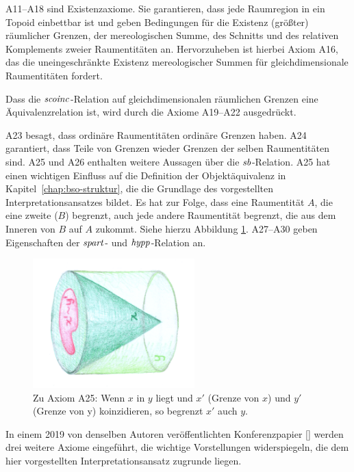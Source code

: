 A11--A18
sind Existenzaxiome. 
Sie garantieren, dass jede Raumregion in ein Topoid einbettbar ist und geben Bedingungen für die Existenz (größter) räumlicher Grenzen, der mereologischen Summe, des Schnitts und des relativen Komplements zweier Raumentitäten an.
Hervorzuheben ist hierbei Axiom A16, das die uneingeschränkte Existenz mereologischer Summen für gleichdimensionale Raumentitäten fordert.

Dass
die $\mathit{scoinc}$-Relation auf gleichdimensionalen räumlichen Grenzen eine Äquivalenzrelation ist, wird durch die Axiome A19--A22 ausgedrückt.

A23
besagt, dass ordinäre Raumentitäten ordinäre Grenzen haben.
A24 garantiert, dass Teile von Grenzen wieder Grenzen der selben Raumentitäten sind.
A25 und A26 enthalten weitere Aussagen über die $\mathit{sb}$-Relation.
A25 hat einen wichtigen Einfluss auf die Definition der Objektäquivalenz in Kapitel~\ref{chap:bso-struktur}, die die Grundlage des vorgestellten Interpretationsansatzes bildet.
Es hat zur Folge, dass eine Raumentität $A$, die eine zweite ($B$) begrenzt, auch jede andere Raumentität begrenzt, die \glqq aus dem Inneren von $B$ auf $A$ zukommt\grqq .
Siehe hierzu Abbildung \ref{fig:A25}.
A27--A30
geben Eigenschaften der $\mathit{spart}$- und $\mathit{hypp}$-Relation an.


    \begin{figure}[ht]
        \centering
        \includegraphics[height=5cm]{abb/a25.png}
        \caption[Zu Axiom 25]{Zu Axiom A25: Wenn $x$ in $y$ liegt und $x'$ (Grenze von $x$) und $y'$ (Grenze von y) koinzidieren, so begrenzt $x'$ auch $y$.}
        \label{fig:A25}
    \end{figure}
    
    In
    einem 2019 von denselben Autoren veröffentlichten Konferenzpapier [\cite{baumann-r-2019--a}] werden drei weitere Axiome eingeführt, die wichtige Vorstellungen widerspiegeln, die dem hier vorgestellten Interpretationsansatz zugrunde liegen.
    
